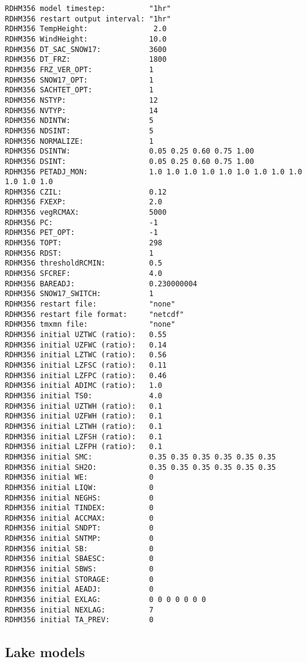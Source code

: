  \begin{Verbatim}[frame=single]
RDHM356 model timestep:          "1hr"
RDHM356 restart output interval: "1hr"
RDHM356 TempHeight:               2.0
RDHM356 WindHeight:              10.0
RDHM356 DT_SAC_SNOW17:           3600
RDHM356 DT_FRZ:                  1800
RDHM356 FRZ_VER_OPT:             1
RDHM356 SNOW17_OPT:              1
RDHM356 SACHTET_OPT:             1
RDHM356 NSTYP:                   12
RDHM356 NVTYP:                   14
RDHM356 NDINTW:                  5
RDHM356 NDSINT:                  5
RDHM356 NORMALIZE:               1
RDHM356 DSINTW:                  0.05 0.25 0.60 0.75 1.00
RDHM356 DSINT:                   0.05 0.25 0.60 0.75 1.00
RDHM356 PETADJ_MON:              1.0 1.0 1.0 1.0 1.0 1.0 1.0 1.0 1.0 1.0 1.0 1.0
RDHM356 CZIL:                    0.12
RDHM356 FXEXP:                   2.0
RDHM356 vegRCMAX:                5000
RDHM356 PC:                      -1
RDHM356 PET_OPT:                 -1
RDHM356 TOPT:                    298
RDHM356 RDST:                    1
RDHM356 thresholdRCMIN:          0.5
RDHM356 SFCREF:                  4.0
RDHM356 BAREADJ:                 0.230000004
RDHM356 SNOW17_SWITCH:           1
RDHM356 restart file:            "none"
RDHM356 restart file format:     "netcdf"
RDHM356 tmxmn file:              "none"
RDHM356 initial UZTWC (ratio):   0.55
RDHM356 initial UZFWC (ratio):   0.14
RDHM356 initial LZTWC (ratio):   0.56
RDHM356 initial LZFSC (ratio):   0.11
RDHM356 initial LZFPC (ratio):   0.46
RDHM356 initial ADIMC (ratio):   1.0
RDHM356 initial TS0:             4.0
RDHM356 initial UZTWH (ratio):   0.1
RDHM356 initial UZFWH (ratio):   0.1
RDHM356 initial LZTWH (ratio):   0.1
RDHM356 initial LZFSH (ratio):   0.1
RDHM356 initial LZFPH (ratio):   0.1
RDHM356 initial SMC:             0.35 0.35 0.35 0.35 0.35 0.35
RDHM356 initial SH2O:            0.35 0.35 0.35 0.35 0.35 0.35
RDHM356 initial WE:              0
RDHM356 initial LIQW:            0
RDHM356 initial NEGHS:           0
RDHM356 initial TINDEX:          0
RDHM356 initial ACCMAX:          0
RDHM356 initial SNDPT:           0
RDHM356 initial SNTMP:           0
RDHM356 initial SB:              0
RDHM356 initial SBAESC:          0
RDHM356 initial SBWS:            0
RDHM356 initial STORAGE:         0
RDHM356 initial AEADJ:           0
RDHM356 initial EXLAG:           0 0 0 0 0 0 0
RDHM356 initial NEXLAG:          7
RDHM356 initial TA_PREV:         0
 \end{Verbatim}

 
 
 \subsection{Lake models} \label{ssec:lakes}
 

